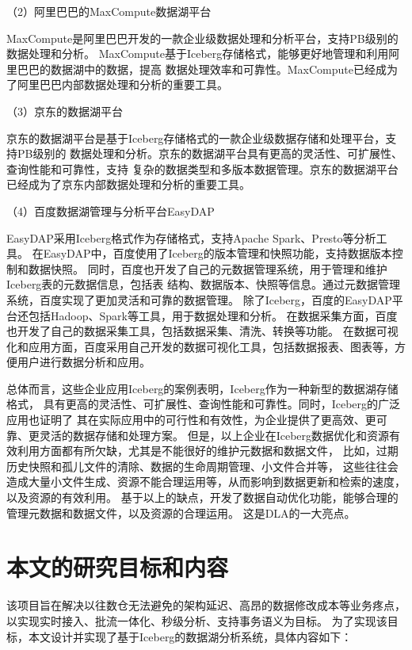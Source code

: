 （2）阿里巴巴的MaxCompute数据湖平台

MaxCompute是阿里巴巴开发的一款企业级数据处理和分析平台，支持PB级别的数据处理和分析\cite{39}。
MaxCompute基于Iceberg存储格式，能够更好地管理和利用阿里巴巴的数据湖中的数据，提高
数据处理效率和可靠性。MaxCompute已经成为了阿里巴巴内部数据处理和分析的重要工具。

（3）京东的数据湖平台

京东的数据湖平台是基于Iceberg存储格式的一款企业级数据存储和处理平台，支持PB级别的
数据处理和分析。京东的数据湖平台具有更高的灵活性、可扩展性、查询性能和可靠性，支持
复杂的数据类型和多版本数据管理。京东的数据湖平台已经成为了京东内部数据处理和分析的重要工具。

（4）百度数据湖管理与分析平台EasyDAP

EasyDAP采用Iceberg格式作为存储格式，支持Apache Spark、Presto等分析工具。
在EasyDAP中，百度使用了Iceberg的版本管理和快照功能，支持数据版本控制和数据快照。
同时，百度也开发了自己的元数据管理系统，用于管理和维护Iceberg表的元数据信息，包括表
结构、数据版本、快照等信息。通过元数据管理系统，百度实现了更加灵活和可靠的数据管理。
除了Iceberg，百度的EasyDAP平台还包括Hadoop、Spark等工具，用于数据处理和分析。
在数据采集方面，百度也开发了自己的数据采集工具，包括数据采集、清洗、转换等功能。
在数据可视化和应用方面，百度采用自己开发的数据可视化工具，包括数据报表、图表等，方便用户进行数据分析和应用。

总体而言，这些企业应用Iceberg的案例表明，Iceberg作为一种新型的数据湖存储格式，
具有更高的灵活性、可扩展性、查询性能和可靠性。同时，Iceberg的广泛应用也证明了
其在实际应用中的可行性和有效性，为企业提供了更高效、更可靠、更灵活的数据存储和处理方案。
但是，以上企业在Iceberg数据优化和资源有效利用方面都有所欠缺，尤其是不能很好的维护元数据和数据文件，
比如，过期历史快照和孤儿文件的清除、数据的生命周期管理、小文件合并等，
这些往往会造成大量小文件生成、资源不能合理运用等，从而影响到数据更新和检索的速度，以及资源的有效利用。
基于以上的缺点，开发了数据自动优化功能，能够合理的管理元数据和数据文件，以及资源的合理运用。
这是DLA的一大亮点。

\section{本文的研究目标和内容}

该项目旨在解决以往数仓无法避免的架构延迟、高昂的数据修改成本等业务疼点，以实现实时接入、批流一体化、秒级分析、支持事务语义为目标。
为了实现该目标，本文设计并实现了基于Iceberg的数据湖分析系统，具体内容如下：

